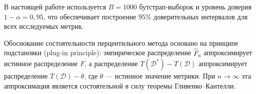 В настоящей работе используется $B = 1000$ бутстрап-выборок и уровень
доверия $1 - \alpha = 0{,}95$, что обеспечивает построение $95\%$
доверительных интервалов для всех исследуемых метрик.

Обоснование состоятельности перцентильного метода основано на принципе
подстановки (plug-in principle): эмпирическое распределение
$\hat{F}_n$ аппроксимирует истинное распределение $F$, а распределение
$T(\mathcal{D}^{*}) - T(\mathcal{D})$ аппроксимирует распределение
$T(\mathcal{D}) - \theta$, где $\theta$ --- истинное значение метрики.
При $n \to \infty$ эта аппроксимация является состоятельной в силу
теоремы Гливенко--Кантелли.
